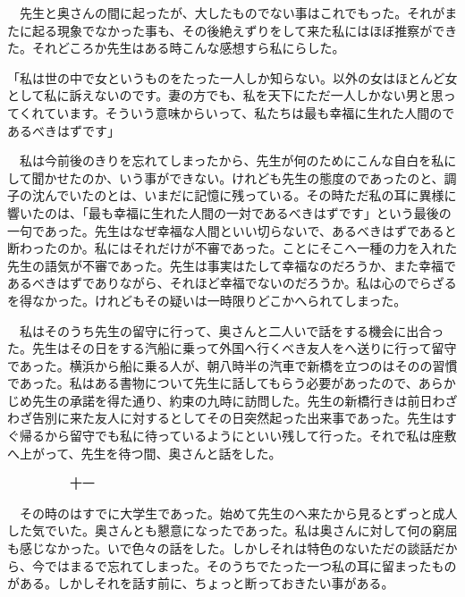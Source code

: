 \documentclass[a4j,onecolumn]{tarticle}
\begin{document}
　先生と奥さんの間に起ったが、\hbox{}大したものでない事はこれでもった。\hbox{}それがまたに起る現象でなかった事も、\hbox{}その後絶えずりをして来た私にはほぼ推察ができた。\hbox{}それどころか先生はある時こんな感想すら私にらした。\hbox{}\par{}
「私は世の中で女というものをたった一人しか知らない。\hbox{}以外の女はほとんど女として私に訴えないのです。\hbox{}妻の方でも、\hbox{}私を天下にただ一人しかない男と思ってくれています。\hbox{}そういう意味からいって、\hbox{}私たちは最も幸福に生れた人間のであるべきはずです」\par{}
　私は今前後のきりを忘れてしまったから、\hbox{}先生が何のためにこんな自白を私にして聞かせたのか、\hbox{}いう事ができない。\hbox{}けれども先生の態度のであったのと、\hbox{}調子の沈んでいたのとは、\hbox{}いまだに記憶に残っている。\hbox{}その時ただ私の耳に異様に響いたのは、\hbox{}「最も幸福に生れた人間の一対であるべきはずです」という最後の一句であった。\hbox{}先生はなぜ幸福な人間といい切らないで、\hbox{}あるべきはずであると断わったのか。\hbox{}私にはそれだけが不審であった。\hbox{}ことにそこへ一種の力を入れた先生の語気が不審であった。\hbox{}先生は事実はたして幸福なのだろうか、\hbox{}また幸福であるべきはずでありながら、\hbox{}それほど幸福でないのだろうか。\hbox{}私は心のでらざるを得なかった。\hbox{}けれどもその疑いは一時限りどこかへられてしまった。\hbox{}\par{}
　私はそのうち先生の留守に行って、\hbox{}奥さんと二人いで話をする機会に出合った。\hbox{}先生はその日をする汽船に乗って外国へ行くべき友人をへ送りに行って留守であった。\hbox{}横浜から船に乗る人が、\hbox{}朝八時半の汽車で新橋を立つのはそのの習慣であった。\hbox{}私はある書物について先生に話してもらう必要があったので、\hbox{}あらかじめ先生の承諾を得た通り、\hbox{}約束の九時に訪問した。\hbox{}先生の新橋行きは前日わざわざ告別に来た友人に対するとしてその日突然起った出来事であった。\hbox{}先生はすぐ帰るから留守でも私に待っているようにといい残して行った。\hbox{}それで私は座敷へ上がって、\hbox{}先生を待つ間、\hbox{}奥さんと話をした。\hbox{}\par{}\par{}　　　　　十一
\par{}
　その時のはすでに大学生であった。\hbox{}始めて先生のへ来たから見るとずっと成人した気でいた。\hbox{}奥さんとも懇意になったであった。\hbox{}私は奥さんに対して何の窮屈も感じなかった。\hbox{}いで色々の話をした。\hbox{}しかしそれは特色のないただの談話だから、\hbox{}今ではまるで忘れてしまった。\hbox{}そのうちでたった一つ私の耳に留まったものがある。\hbox{}しかしそれを話す前に、\hbox{}ちょっと断っておきたい事がある。\hbox{}\par{}
\end{document}
